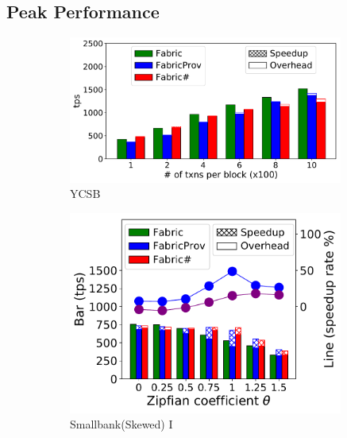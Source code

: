\subsection{Peak Performance}

\begin{figure}[t]
	\centering
    \begin{subfigure}{0.75\textwidth}
      \includegraphics[width=0.99\textwidth]{chart/txn/ycsb_thruput.pdf}
      \caption{YCSB}
      \label{chart:txn:ycsb_thruput}
    \end{subfigure}
    \begin{subfigure}{0.45\textwidth}
      \includegraphics[width=0.99\textwidth]{chart/txn/smallbank_skew.pdf}
      \caption{Smallbank(Skewed) I}
      \label{chart:txn:smallbank_skew}
    \end{subfigure}
    \begin{subfigure}{0.45\textwidth}

\end{subfigure}
\end{figure}
